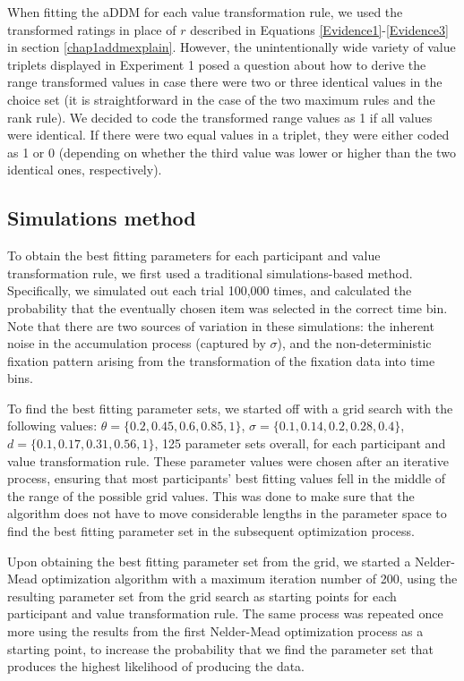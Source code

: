 \documentclass[11pt,a4paper]{article}
\begin{document}
When fitting the aDDM for each value transformation rule, we used the transformed ratings in place of $r$ described in Equations \ref{Evidence1}-\ref{Evidence3} in section \ref{chap1addmexplain}. However, the unintentionally wide variety of value triplets displayed in Experiment 1 posed a question about how to derive the range transformed values in case there were two or three identical values in the choice set (it is straightforward in the case of the two maximum rules and the rank rule). We decided to code the transformed range values as 1 if all values were identical. If there were two equal values in a triplet, they were either coded as 1 or 0 (depending on whether the third value was lower or higher than the two identical ones, respectively). 


\subsection{Simulations method}

To obtain the best fitting parameters for each participant and value transformation rule, we first used a traditional simulations-based method. Specifically, we simulated out each trial 100,000 times, and calculated the probability that the eventually chosen item was selected in the correct time bin. Note that there are two sources of variation in these simulations: the inherent noise in the accumulation process (captured by $\sigma$), and the non-deterministic fixation pattern arising from the transformation of the fixation data into time bins.

To find the best fitting parameter sets, we started off with a grid search with the following values: $\theta=\{0.2, 0.45, 0.6, 0.85, 1\}$, $\sigma=\{0.1, 0.14, 0.2, 0.28, 0.4\}$, $\textit{d}=\{0.1, 0.17, 0.31, 0.56, 1\}$, 125 parameter sets overall, for each participant and value transformation rule. These parameter values were chosen after an iterative process, ensuring that most participants' best fitting values fell in the middle of the range of the possible grid values. This was done to make sure that the algorithm does not have to move considerable lengths in the parameter space to find the best fitting parameter set in the subsequent optimization process.


Upon obtaining the best fitting parameter set from the grid, we started a Nelder-Mead optimization algorithm with a maximum iteration number of 200, using the resulting parameter set from the grid search as starting points for each participant and value transformation rule. The same process was repeated once more using the results from the first Nelder-Mead optimization process as a starting point, to increase the probability that we find the parameter set that produces the highest likelihood of producing the data. 
\end{document}
